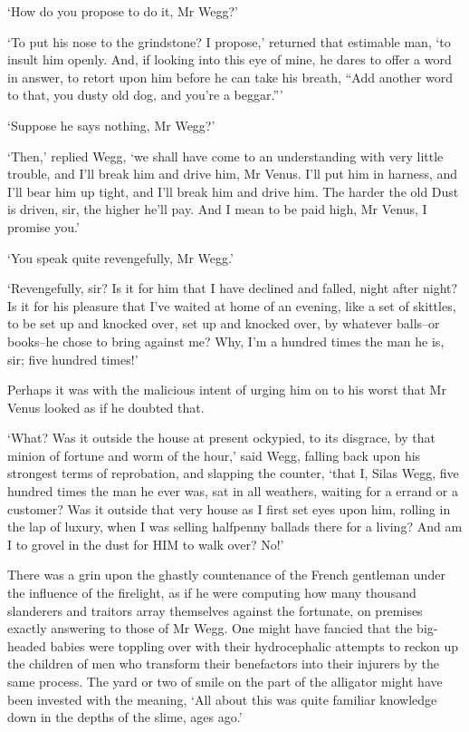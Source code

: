 ‘How do you propose to do it, Mr Wegg?’

‘To put his nose to the grindstone? I propose,’ returned that estimable
man, ‘to insult him openly. And, if looking into this eye of mine, he
dares to offer a word in answer, to retort upon him before he can take
his breath, “Add another word to that, you dusty old dog, and you’re a
beggar.”’

‘Suppose he says nothing, Mr Wegg?’

‘Then,’ replied Wegg, ‘we shall have come to an understanding with very
little trouble, and I’ll break him and drive him, Mr Venus. I’ll put
him in harness, and I’ll bear him up tight, and I’ll break him and drive
him. The harder the old Dust is driven, sir, the higher he’ll pay. And I
mean to be paid high, Mr Venus, I promise you.’

‘You speak quite revengefully, Mr Wegg.’

‘Revengefully, sir? Is it for him that I have declined and falled,
night after night? Is it for his pleasure that I’ve waited at home of an
evening, like a set of skittles, to be set up and knocked over, set up
and knocked over, by whatever balls--or books--he chose to bring against
me? Why, I’m a hundred times the man he is, sir; five hundred times!’

Perhaps it was with the malicious intent of urging him on to his worst
that Mr Venus looked as if he doubted that.

‘What? Was it outside the house at present ockypied, to its disgrace,
by that minion of fortune and worm of the hour,’ said Wegg, falling back
upon his strongest terms of reprobation, and slapping the counter,
‘that I, Silas Wegg, five hundred times the man he ever was, sat in all
weathers, waiting for a errand or a customer? Was it outside that very
house as I first set eyes upon him, rolling in the lap of luxury, when I
was selling halfpenny ballads there for a living? And am I to grovel in
the dust for HIM to walk over? No!’

There was a grin upon the ghastly countenance of the French gentleman
under the influence of the firelight, as if he were computing how many
thousand slanderers and traitors array themselves against the fortunate,
on premises exactly answering to those of Mr Wegg. One might have
fancied that the big-headed babies were toppling over with their
hydrocephalic attempts to reckon up the children of men who transform
their benefactors into their injurers by the same process. The yard or
two of smile on the part of the alligator might have been invested with
the meaning, ‘All about this was quite familiar knowledge down in the
depths of the slime, ages ago.’

